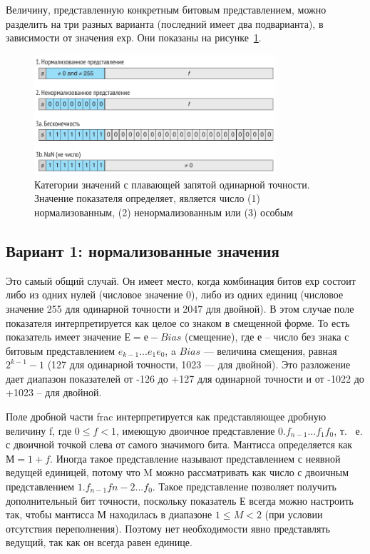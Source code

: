 Величину, представленную конкретным битовым представлением, можно разделить на три разных варианта (последний имеет два подварианта), в зависимости от значения ехр. Они показаны на рисунке~\ref{data02}.

\begin{figure}[htbp]
    \centering
    \includegraphics[width=0.8\textwidth]{img/data02.png}
    \caption{Категории значений с плавающей запятой одинарной точности. Значение показателя определяет, является число (1) нормализованным, (2) ненормализованным или (3) особым}
    \label{data02}
\end{figure}

\subsection{Вариант 1: нормализованные значения}

Это самый общий случай. Он имеет место, когда комбинация битов ехр состоит либо из одних нулей (числовое значение 0), либо из одних единиц (числовое значение 255 для одинарной точности и 2047 для двойной). В этом случае поле показателя интерпретируется как целое со знаком в смещенной форме. То есть показатель имеет значение $Е = е - Bias$ (смещение), где $е$ – число без знака с битовым представлением $e_{k-1} ... e_1e_0$, a $Bias$ --- величина смещения, равная $2^{k-1} - 1$ (127 для одинарной точности, 1023 --- для двойной). Это разложение дает диапазон показателей от -126 до +127 для одинарной точности и от -1022 до +1023 – для двойной.

Поле дробной части frac интерпретируется как представляющее дробную величину f, где $0 \leq f < 1$, имеющую двоичное представление $0.f_{n-1} ... f_1f_0$, т.~ е. с двоичной точкой слева от самого значимого бита. Мантисса определяется как $М = 1 + f$. Иногда такое представление называют представлением с неявной ведущей единицей, потому что M можно рассматривать как число с двоичным представлением $1.f_{n-1}f{n-2} ... f_0$. Такое представление позволяет получить дополнительный бит точности, поскольку показатель Е всегда можно настроить так, чтобы мантисса М находилась в диапазоне $1 \leq M < 2$ (при условии отсутствия переполнения). Поэтому нет необходимости явно представлять ведущий, так как он всегда равен единице.

